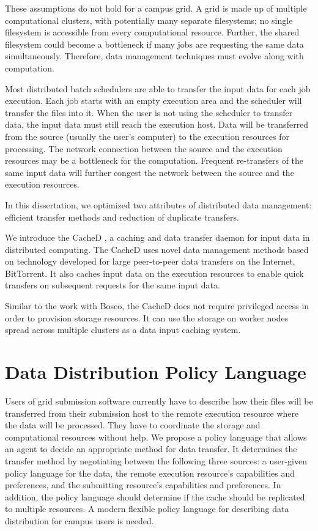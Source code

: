 These assumptions do not hold for a campus grid.  A grid is made up of multiple computational clusters, with potentially many separate filesystems; no single filesystem is accessible from every computational resource.  Further, the shared filesystem could become a bottleneck if many jobs are requesting the same data simultaneously.  Therefore, data management techniques must evolve along with computation.  


Most distributed batch schedulers are able to transfer the input data for each job execution.  Each job starts with an empty execution area and the scheduler will transfer the files into it.  When the user is not using the scheduler to transfer data, the input data must still reach the execution host.  Data will be transferred from the source (usually the user's computer) to the execution resources for processing.  The network connection between the source and the execution resources may be a bottleneck for the computation.  Frequent re-transfers of the same input data will further congest the network between the source and the execution resources.

In this dissertation, we optimized two attributes of distributed data management: efficient transfer methods and reduction of duplicate transfers.

We introduce the CacheD \cite{weitzel2015pdpta}, a caching and data transfer daemon for input data in distributed computing.  The CacheD uses novel data management methods based on technology developed for large peer-to-peer data transfers on the Internet, BitTorrent.  It also caches input data on the execution resources to enable quick transfers on subsequent requests for the same input data.

Similar to the work with Bosco, the CacheD does not require privileged access in order to provision storage resources.  It can use the storage on worker nodes spread across multiple clusters as a data input caching system.

\section{Data Distribution Policy Language}

Users of grid submission software currently have to describe how their files will be transferred from their submission host to the remote execution resource where the data will be processed.  They have to coordinate the storage and computational resources without help.  We propose a policy language that allows an agent to decide an appropriate method for data transfer.  It determines the transfer method by negotiating between the following three sources: a user-given policy language for the data, the remote execution resource's capabilities and preferences, and the submitting resource's capabilities and preferences.  In addition, the policy language should determine if the cache should be replicated to multiple resources.  A modern flexible policy language for describing data distribution for campus users is needed.


